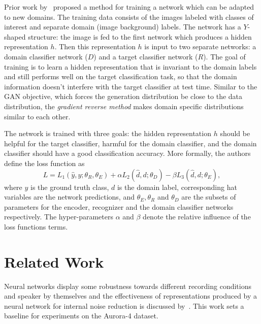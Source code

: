 \documentclass[a4paper]{article}
\begin{document}
    Prior work by~\cite{ganin2014unsupervised} proposed a method for training a network 
    which can be adapted to new domains. The training data consists of the images
    labeled with classes of interest and separate domain (image background) labels. 
    The network has a $Y$-shaped structure: the image is fed to the
    first network which produces a hidden representation $h$. Then this 
    representation $h$ is input to two separate networks: a domain classifier network ($D$) and 
    a target classifier network ($R$). The goal of training is to learn a hidden 
    representation that is invariant to the domain labels and still performs well on 
    the target classification task, so that the domain information doesn't 
    interfere with the target classifier at test time. Similar to the GAN 
    objective, which forces the generation distribution be close to the data distribution,
    the \emph{gradient reverse method} makes domain specific distributions similar to each other.

    The network is trained with three goals: the hidden representation $h$ should
    be helpful for the target classifier, harmful for the domain classifier,
   and the domain classifier should have a good classification accuracy. More 
    formally, the authors define the loss function as
    \begin{equation}
        L = L_1(\hat{y}, y; \theta_R, \theta_E) + 
        \alpha L_2(\hat{d}, d; \theta_D) -
        \beta L_3(\hat{d}, d; \theta_E),
        \label{eq:grm}
    \end{equation}
    where $y$ is the ground truth class, $d$ is the domain label, corresponding
    hat variables are the network predictions, and $\theta_E, \theta_R$ and 
    $\theta_D$ are the subsets of  parameters for the encoder,
    recognizer and the domain classifier networks respectively. The hyper-parameters
    $\alpha$ and $\beta$ denote the relative influence of the loss functions terms.

\section{Related Work}
\label{sec:relatedwork}
    Neural networks display some robustness towards different recording
    conditions and speaker by themselves and the effectiveness of representations
    produced by a neural network for internal 
    noise reduction is discussed by~\cite{yu2013feature}. This work sets a 
    baseline for experiments on the Aurora-4 dataset.
\end{document}
